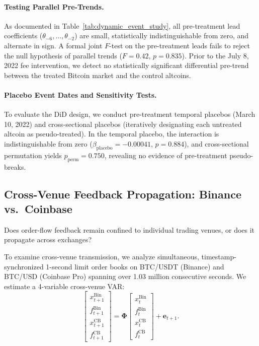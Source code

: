 \documentclass[12pt]{article}
\theoremstyle{definition}
\theoremstyle{remark}
\begin{document}
\paragraph{Testing Parallel Pre-Trends.}
As documented in Table~\ref{tab:dynamic_event_study}, all pre-treatment lead coefficients ($\theta_{-6}, \dots, \theta_{-2}$) are small, statistically indistinguishable from zero, and alternate in sign. A formal joint $F$-test on the pre-treatment leads fails to reject the null hypothesis of parallel trends ($F = 0.42$, $p = 0.835$). Prior to the July 8, 2022 fee intervention, we detect no statistically significant differential pre-trend between the treated Bitcoin market and the control altcoins.

\paragraph{Placebo Event Dates and Sensitivity Tests.}
To evaluate the DiD design, we conduct pre-treatment temporal placebos (March 10, 2022) and cross-sectional placebos (iteratively designating each untreated altcoin as pseudo-treated). In the temporal placebo, the interaction is indistinguishable from zero ($\beta_{\text{placebo}} = -0.00041$, $p = 0.884$), and cross-sectional permutation yields $p_{\text{perm}} = 0.750$, revealing no evidence of pre-treatment pseudo-breaks.

\subsection{Cross-Venue Feedback Propagation: Binance vs.\ Coinbase}
Does order-flow feedback remain confined to individual trading venues, or does it propagate across exchanges?

To examine cross-venue transmission, we analyze simultaneous, timestamp-synchronized 1-second limit order books on BTC/USDT (Binance) and BTC/USD (Coinbase Pro) spanning over 1.03 million consecutive seconds. We estimate a 4-variable cross-venue VAR:
\begin{equation}
\begin{bmatrix} x_{t+1}^{\text{Bin}} \\ f_{t+1}^{\text{Bin}} \\ x_{t+1}^{\text{CB}} \\ f_{t+1}^{\text{CB}} \end{bmatrix} = \mathbf{\Phi} \begin{bmatrix} x_t^{\text{Bin}} \\ f_t^{\text{Bin}} \\ x_t^{\text{CB}} \\ f_t^{\text{CB}} \end{bmatrix} + \mathbf{e}_{t+1}.
\end{equation}
\end{document}
